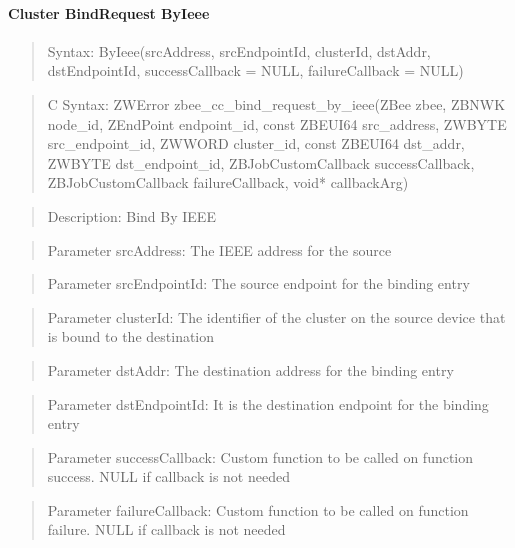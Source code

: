 \paragraph{Cluster BindRequest ByIeee}
\begin{quote}Syntax: ByIeee(srcAddress, srcEndpointId, clusterId, dstAddr, dstEndpointId, successCallback = NULL, failureCallback = NULL)\end{quote}
\begin{quote}C Syntax: ZWError zbee\_cc\_bind\_request\_by\_ieee(ZBee zbee, ZBNWK node\_id, ZEndPoint endpoint\_id, const ZBEUI64 src\_address, ZWBYTE src\_endpoint\_id, ZWWORD cluster\_id, const ZBEUI64 dst\_addr, ZWBYTE dst\_endpoint\_id, ZBJobCustomCallback successCallback, ZBJobCustomCallback failureCallback, void* callbackArg)\end{quote}
\begin{quote}Description: Bind By IEEE\end{quote}
\begin{quote}Parameter srcAddress: The IEEE address for the source\end{quote}
\begin{quote}Parameter srcEndpointId: The source endpoint for the binding entry\end{quote}
\begin{quote}Parameter clusterId: The identifier of the cluster on the source device that is bound to the destination\end{quote}
\begin{quote}Parameter dstAddr: The destination address for the binding entry\end{quote}
\begin{quote}Parameter dstEndpointId: It is the destination endpoint for the binding entry\end{quote}
\begin{quote}Parameter successCallback: Custom function to be called on function success. NULL if callback is not needed\end{quote}
\begin{quote}Parameter failureCallback: Custom function to be called on function failure. NULL if callback is not needed\end{quote}


